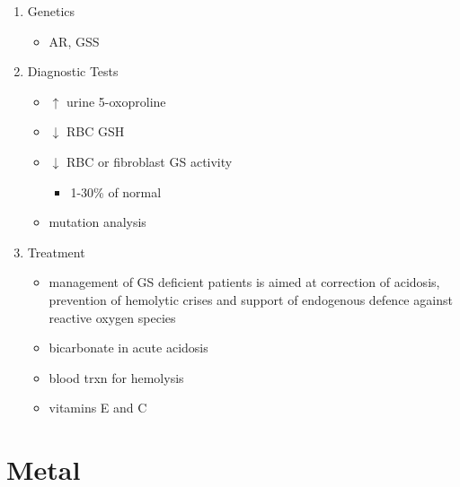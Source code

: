 \documentclass{scrartcl}
\begin{document}
\begin{enumerate}
\item Genetics
\label{sec:org2c38afe}
\begin{itemize}
\item AR, GSS
\end{itemize}

\item Diagnostic Tests
\label{sec:org5872e18}
\begin{itemize}
\item \(\uparrow\) urine 5-oxoproline
\item \(\downarrow\) RBC GSH
\item \(\downarrow\) RBC or fibroblast GS activity
\begin{itemize}
\item 1-30\% of normal
\end{itemize}
\item mutation analysis
\end{itemize}

\item Treatment
\label{sec:org6edc2ca}
\begin{itemize}
\item management of GS deficient patients is aimed at correction of
acidosis, prevention of hemolytic crises and support of endogenous
defence against reactive oxygen species
\item bicarbonate in acute acidosis
\item blood trxn for hemolysis
\item vitamins E and C
\end{itemize}
\end{enumerate}
\section{Metal}
\label{sec:orgd89ab79}
\end{document}
